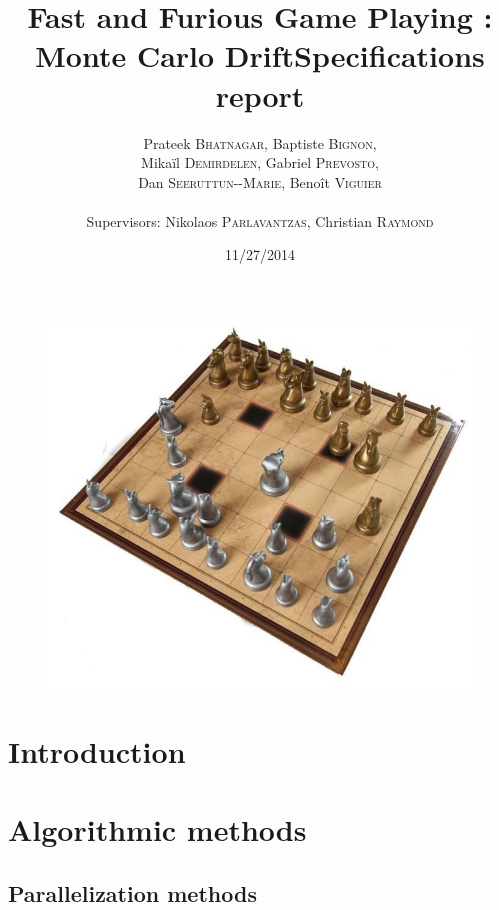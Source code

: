 \documentclass[12pt]{article}
\title{Fast and Furious Game Playing : Monte Carlo Drift\smallbreak Specifications report} %
\author{Prateek \textsc{Bhatnagar}, Baptiste \textsc{Bignon}, \\
        Mikaïl \textsc{Demirdelen}, Gabriel \textsc{Prevosto}, \\
        Dan \textsc{Seeruttun-{}-Marie}, Benoît \textsc{Viguier} \\
        \\
        Supervisors: Nikolaos \textsc{Parlavantzas}, Christian \textsc{Raymond}}
\date{11/27/2014}
\begin{document}
\maketitle

\begin{figure}[!h] 
\centerline{\includegraphics[scale=0.50]{Pictures/arimaa}}
\end{figure}
\newpage


\begin{abstract}
	
\end{abstract}
\newpage

\tableofcontents
\newpage


\section{Introduction}						\label{sec:introduction} 		
\newpage

\section{Algorithmic methods}
					\label{sec:algorithmicMethods}
	\subsection{Parallelization methods}			\label{sec:parallelization}		
\end{document}
